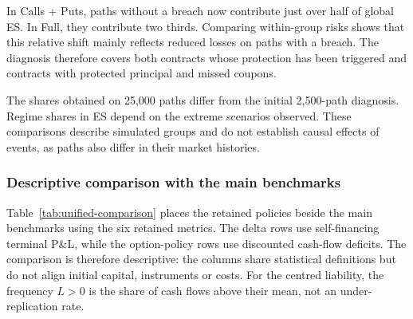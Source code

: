 \documentclass[12pt,a4paper]{article}
\newcommand{\1}{\mathbf{1}}
\begin{document}
In Calls + Puts, paths without a breach now contribute just over half of global ES. In Full, they contribute two thirds. Comparing within-group risks shows that this relative shift mainly reflects reduced losses on paths with a breach. The diagnosis therefore covers both contracts whose protection has been triggered and contracts with protected principal and missed coupons.

The shares obtained on 25,000 paths differ from the initial 2,500-path diagnosis. Regime shares in ES depend on the extreme scenarios observed. These comparisons describe simulated groups and do not establish causal effects of events, as paths also differ in their market histories.

\subsubsection*{Descriptive comparison with the main benchmarks}

Table~\ref{tab:unified-comparison} places the retained policies beside the main
benchmarks using the six retained metrics. The delta rows use self-financing
terminal P\&L, while the option-policy rows use discounted cash-flow deficits.
The comparison is therefore descriptive: the columns share statistical
definitions but do not align initial capital, instruments or costs. For the
centred liability, the frequency $L>0$ is the share of cash flows above their
mean, not an under-replication rate.
\end{document}
